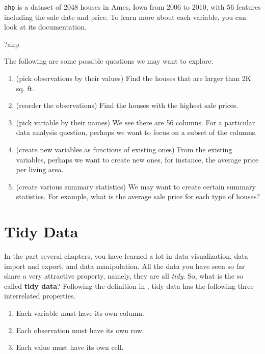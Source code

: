 \documentclass[
]{book}
\newenvironment{Shaded}{\begin{snugshade}}{\end{snugshade}}
\newcommand{\NormalTok}[1]{#1}
\providecommand{\tightlist}{%
  \setlength{\itemsep}{0pt}\setlength{\parskip}{0pt}}
\begin{document}
\texttt{ahp} is a dataset of 2048 houses in Ames, Iowa from 2006 to 2010, with 56 features including the sale date and price. To learn more about each variable, you can look at its documentation.

\begin{Shaded}
\begin{Highlighting}[]
\NormalTok{?ahp}
\end{Highlighting}
\end{Shaded}

The following are some possible questions we may want to explore.

\begin{enumerate}
\def\labelenumi{\arabic{enumi}.}
\item
  (pick observations by their values) Find the houses that are larger than 2K sq. ft.
\item
  (reorder the observations) Find the houses with the highest sale prices.
\item
  (pick variable by their names) We see there are 56 columns. For a particular data analysis question, perhaps we want to focus on a subset of the columns.
\item
  (create new variables as functions of existing ones) From the existing variables, perhaps we want to create new ones, for instance, the average price per living area.
\item
  (create various summary statistics) We may want to create certain summary statistics. For example, what is the average sale price for each type of houses?
\end{enumerate}

\hypertarget{tidy-data}{%
\chapter{Tidy Data}\label{tidy-data}}

In the part several chapters, you have learned a lot in data visualization, data import and export, and data manipulation. All the data you have seen so far share a very attractive property, namely, they are all \emph{tidy}. So, what is the so called \textbf{tidy data}? Following the definition in \citet{wickham2016r}, tidy data has the following three interrelated properties.

\begin{enumerate}
\def\labelenumi{\arabic{enumi}.}
\tightlist
\item
  Each variable must have its own column.
\item
  Each observation must have its own row.
\item
  Each value must have its own cell.
\end{enumerate}
\end{document}
